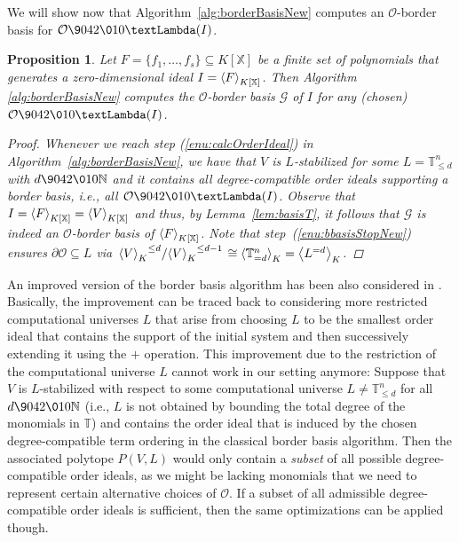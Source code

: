 \documentclass[11pt,oneside,english]{amsart}
\makeatletter
\numberwithin{equation}{section}
\numberwithin{figure}{section}
\theoremstyle{plain}
\theoremstyle{definition}
\theoremstyle{definition}
\theoremstyle{remark}
\theoremstyle{plain}
\theoremstyle{plain}
\theoremstyle{plain}
\newtheorem{prop}[thm]{Proposition}
\theoremstyle{problem@}
\makeatother
\begin{document}
We will show now that Algorithm~\ref{alg:borderBasisNew} computes an ${\mathcal{O}}$-border basis for ${\mathcal{O}} {\9042\010} {\textLambda}(I)$.

\begin{prop}
\label{pro:bbasisNew}Let $F=\{f_{1},\dots,f_{s}\}\subseteq {K[\mathbb{X}]}$
be a finite set of polynomials that generates a zero-dimensional ideal
$I={{\left\langle {F}\right\rangle}\sb{K[\mathbb{X}]}}$. Then Algorithm \ref{alg:borderBasisNew} computes
the ${\mathcal{O}}$-border basis $\mathcal{G}$ of $I$ for any (chosen) ${\mathcal{O}} {\9042\010} {\textLambda}(I)$.
\begin{proof}
Whenever we reach step (\ref{enu:calcOrderIdeal}) in
Algorithm~\ref{alg:borderBasisNew}, we have that $V$ is $L$-stabilized for
some $L = {\mathbb{T}}^n_{\leq d}$ with $d{\9042\010} {\mathbb{N}}$ and it contains all degree-compatible
order ideals supporting a border basis, i.e., all ${\mathcal{O}} {\9042\010} {\textLambda}(I)$.
Observe that $I = {{\left\langle {F}\right\rangle}\sb{K[\mathbb{X}]}} = {{\left\langle {V}\right\rangle}\sb{K[\mathbb{X}]}}$ and thus, by
Lemma~\ref{lem:basisT}, it follows that $\mathcal G$ is indeed an
${\mathcal{O}}$-border basis of ${{\left\langle {F}\right\rangle}\sb{K[\mathbb{X}]}}$.
Note that step~(\ref{enu:bbasisStopNew}) ensures
$\partial {\mathcal{O}} \subseteq L$
via \(\left. {{\left\langle {V}\right\rangle}\sb{K}}^{\leq d} / {{\left\langle {V}\right\rangle}\sb{K}}^{\leq d-1} \right. \cong
 {{\left\langle {{\mathbb{T}}^{n}_{= d}}\right\rangle}\sb{K}} = {{\left\langle {L^{= d}}\right\rangle}\sb{K}}\).
\end{proof}
\end{prop}

An improved version of the border basis algorithm has been also considered in
\cite{kehrein2006cbb}. Basically, the improvement can be traced back to
considering more restricted computational universes $L$ that arise from
choosing $L$ to be the smallest order ideal that contains the support of the
initial system and then successively extending it using the $+$
operation. This improvement due to the restriction of the computational universe
$L$ cannot work in our setting anymore: Suppose that $V$ is $L$-stabilized with
respect to some computational universe $L \neq {\mathbb{T}}^n_{\leq d}$ for all $d
{\9042\010} {\mathbb{N}}$ (i.e., \(L\) is not obtained by bounding the total degree of
the monomials in \({\mathbb{T}}\)) and contains the order ideal that is induced by the chosen
degree-compatible term ordering in the classical border basis algorithm. Then
the associated polytope $P(V,L)$ would only contain a \emph{subset} of all
possible degree-compatible order ideals, as we might be lacking monomials that
we need to represent certain alternative choices of ${\mathcal{O}}$. If a subset of all admissible 
degree-compatible order ideals is sufficient, then the same optimizations can be applied though.
\end{document}
